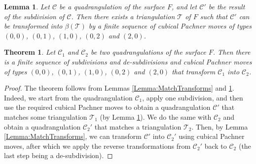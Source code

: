 \documentclass[10pt,a4paper]{amsart}
\newtheorem{lemma}{Lemma}
\newtheorem{theorem}{Theorem}
\begin{document}
\begin{lemma}
    \label{Lemma:Subdivide}
    Let $\mathcal{C}$ be a quadrangulation of the surface $F$, and let $\mathcal{C}'$ be the result of the subdivision of $\mathcal{C}$. Then there exists a triangulation $\mathcal{T}$ of $F$ such that $\mathcal{C}'$ can be transformed into $\beta(\mathcal{T})$ by a finite sequence of cubical Pachner moves of types $(0, 0)$, $(0, 1)$, $(1, 0)$, $(0, 2)$ and $(2, 0)$.
\end{lemma}

\begin{theorem}
    \label{Theorem:Transforms}
    Let $\mathcal{C}_1$ and $\mathcal{C}_2$ be two quadrangulations of the surface $F$. Then there is a finite sequence of subdivisions and de-subdivisions and cubical Pachner moves of types $(0, 0)$, $(0, 1)$, $(1, 0)$, $(0, 2)$ and $(2, 0)$ that transform $\mathcal{C}_1$ into $\mathcal{C}_2$.
\end{theorem}

\begin{proof}
    The theorem follows from Lemmas \ref{Lemma:MatchTransforms} and \ref{Lemma:Subdivide}. Indeed, we start from the quadrangulation $\mathcal{C}_1$, apply one subdivision, and then use the required cubical Pachner moves to obtain a quadrangulation $\mathcal{C}'$ that matches some triangulation $\mathcal{T}_1$ (by Lemma \ref{Lemma:Subdivide}). We do the same with $\mathcal{C}_2$ and obtain a quadrangulation $\mathcal{C}_2'$ that matches a triangulation $\mathcal{T}_2$. Then, by Lemma \ref{Lemma:MatchTransforms}, we can transform $\mathcal{C}'$ into $\mathcal{C}_2'$ using cubical Pachner moves, after which we apply the reverse transformations from $\mathcal{C}_2'$ back to $\mathcal{C}_2$ (the last step being a de-subdivision).
\end{proof}
\end{document}
